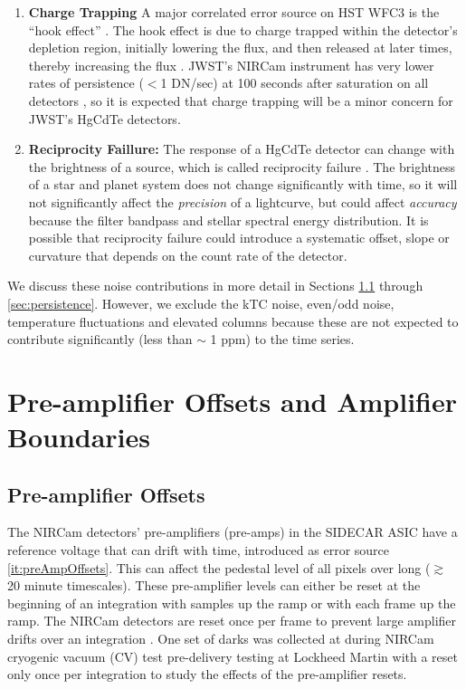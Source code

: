 \documentclass[]{aastex62}
\begin{document}
\begin{enumerate}[resume]
	\item \textbf{Charge Trapping} A major correlated error source on HST WFC3 is the ``hook effect'' \citep{berta2012flat_gj1214}.
	The hook effect is due to charge trapped within the detector's depletion region, initially lowering the flux, and then released at later times, thereby increasing the flux \citep{zhou2017chargeTrap}.
	JWST's NIRCam instrument has very lower rates of persistence ($<$1 DN/sec) at 100 seconds after saturation on all detectors \citep{leisenring2016persistence}, so it is expected that charge trapping will be a minor concern for JWST's HgCdTe detectors.
	\item \textbf{Reciprocity Faillure:} The response of a HgCdTe detector can change with the brightness of a source, which is called reciprocity failure \citep{biesiadzinski2011reciprocityFailure}.
	The brightness of a star and planet system does not change significantly with time, so it will not significantly affect the {\it precision} of a lightcurve, but could affect {\it accuracy} because the filter bandpass and stellar spectral energy distribution.
	It is possible that reciprocity failure could introduce a systematic offset, slope or curvature that depends on the count rate of the detector.
\end{enumerate}

We discuss these noise contributions in more detail in Sections \ref{sec:preAmp} through \ref{sec:persistence}.
However, we exclude the kTC noise, even/odd noise, temperature fluctuations and elevated columns because these are not expected to contribute significantly (less than $\sim$ 1 ppm) to the time series.

\section{Pre-amplifier Offsets and Amplifier Boundaries}


\subsection{Pre-amplifier Offsets}\label{sec:preAmp}
The NIRCam detectors' pre-amplifiers (pre-amps) in the SIDECAR ASIC have a reference voltage that can drift with time, introduced as error source \ref{it:preAmpOffsets}.
This can affect the pedestal level of all pixels over long ($\gtrsim$ 20 minute timescales).
These pre-amplifier levels can either be reset at the beginning of an integration with samples up the ramp or with each frame up the ramp.
The NIRCam detectors are reset once per frame to prevent large amplifier drifts over an integration \citep{robberto2014refPixPreAmp}.
One set of darks was collected at during NIRCam cryogenic vacuum (CV) test pre-delivery testing at Lockheed Martin with a reset only once per integration to study the effects of the pre-amplifier resets.
\end{document}
